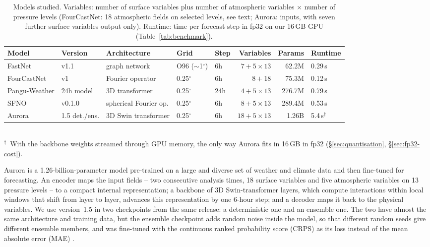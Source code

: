 \begin{table}[htbp]
\centering
\footnotesize
\caption{Models studied. Variables: number of surface variables plus
number of atmospheric variables $\times$ number of pressure levels
(FourCastNet: 18 atmospheric fields on selected levels, see text; Aurora:
inputs, with seven further surface variables output only).
Runtime: time per forecast step in fp32 on our 16\,GB GPU
(Table~\ref{tab:benchmark}).}
\label{tab:models}
\setlength{\tabcolsep}{4pt}
\begin{tabular}{lllllrrl}
\toprule
Model & Version & Architecture & Grid & Step & Variables & Params & Runtime\\
\midrule
\shortstack[l]{FastNet\\\citep{dunstan2025fastnet}} & v1.1 & graph network & O96 ($\sim$1$^\circ$) & 6h & $7 + 5{\times}13$ & 62.2M & 0.29\,s \\
\shortstack[l]{FourCastNet\\\citep{pathak2022fourcastnet}} & v1 & Fourier operator & 0.25$^\circ$ & 6h & $8 + 18$ & 75.3M & 0.12\,s \\
\shortstack[l]{Pangu-Weather\\\citep{bi2023pangu}} & 24h model & 3D transformer & 0.25$^\circ$ & 24h & $4 + 5{\times}13$ & 276.7M & 0.79\,s \\
\shortstack[l]{SFNO\\\citep{bonev2023sfno}} & v0.1.0 & spherical Fourier op. & 0.25$^\circ$ & 6h & $8 + 5{\times}13$ & 289.4M & 0.53\,s \\
\shortstack[l]{Aurora\\\citep{bodnar2024aurora}} & 1.5 det./ens. & 3D Swin transformer & 0.25$^\circ$ & 6h & $18 + 5{\times}13$ & 1.26B & 5.4\,s$^\dagger$ \\
\bottomrule
\end{tabular}\\[2pt]
{\scriptsize $^\dagger$~With the backbone
weights streamed through GPU memory, the only way Aurora fits in 16\,GB
in fp32 (\S\ref{sec:quantisation}, \S\ref{sec:fp32-cost}).}
\end{table}

Aurora \citep{bodnar2024aurora} is a 1.26-billion-parameter model
pre-trained on a large and diverse set of weather and climate data and
then fine-tuned for forecasting. An encoder maps the input fields -- two
consecutive analysis times, 18 surface variables and five atmospheric
variables on 13 pressure levels -- to a compact internal representation;
a backbone of 3D Swin-transformer layers, which compute interactions
within local windows that shift from layer to layer, advances this
representation by one 6-hour step; and a decoder maps it back to the
physical variables. We use version~1.5 \citep{aurora_docs} in two
checkpoints from the same release: a deterministic one and an ensemble
one. The two have almost the same architecture and training data, but
the ensemble checkpoint adds random noise inside the model, so that
different random seeds give different ensemble members, and was fine-tuned
with the continuous ranked probability score (CRPS) as its loss instead
of the mean absolute error (MAE) \citep{weyn2026aurora15}.

